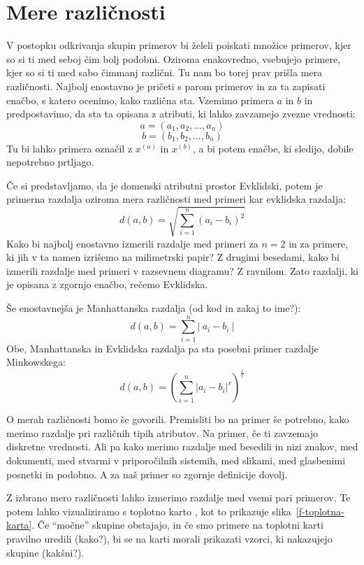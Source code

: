 \section{Mere različnosti}

V postopku odkrivanja skupin primerov bi želeli poiskati množice
primerov, kjer so si ti med seboj čim bolj podobni. Oziroma
enakovredno, vsebujejo primere, kjer so si ti med sabo čimmanj
različni. Tu nam bo torej prav prišla mera različnosti. Najbolj
enostavno je pričeti s parom primerov in za ta zapisati enačbo, s
katero ocenimo, kako različna sta. Vzemimo primera $a$ in $b$ in
predpostavimo, da sta ta opisana z atributi, ki lahko zavzamejo zvezne
vrednosti:
%
$$ a = (a_1,a_2, \ldots, a_n) $$
$$ b = (b_1,b_2, \ldots, b_n) $$
%
Tu bi lahko primera označil z $x^{(a)}$ in $x^{(b)}$, a bi potem
enačbe, ki sledijo, dobile nepotrebno prtljago.

Če si predstavljamo, da je domenski atributni prostor Evklidski, potem
je primerna razdalja oziroma mera različnosti med primeri kar
evklidska razdalja:
$$ d(a,b)=\sqrt{\sum_{i=1}^n(a_i-b_i)^2} $$ 
%
Kako bi najbolj enostavno izmerili razdalje med primeri za $n=2$ in za
primere, ki jih v ta namen izrišemo na milimetrski papir? Z drugimi
besedami, kako bi izmerili razdalje med primeri v razsevnem diagramu?
Z ravnilom. Zato razdalji, ki je opisana z zgornjo enačbo, rečemo
Evklidska.

Še enostavnejša je Manhattanska razdalja (od kod in zakaj to ime?):
$$ d(a,b)={\sum_{i=1}^n|\ a_i-b_i\ |} $$
Obe, Manhattanska in Evklidska razdalja pa sta posebni primer razdalje
Minkowskega:
$$ d(a,b)=({\sum_{i=1}^n|a_i-b_i|^r})^{\frac{1}{r}} $$

O merah različnosti bomo še govorili. Premisliti bo na primer še
potrebno, kako merimo razdalje pri različnih tipih atributov. Na
primer, če ti zavzemajo diskretne vrednosti. Ali pa kako merimo
razdalje med besedili in nizi znakov, med dokumenti, med stvarmi v
priporočilnih sistemih, med slikami, med glasbenimi posnetki in
podobno. A za naš primer so zgornje definicije dovolj.

Z izbrano mero različnosti lahko izmerimo razdalje med vsemi
pari primerov. Te potem lahko vizualiziramo s toplotno karto
, kot to prikazuje slika~\ref{f-toplotna-karta}. Če
``močne'' skupine obstajajo, in če smo primere na toplotni karti
pravilno uredili (kako?), bi se na karti morali prikazati vzorci, ki
nakazujejo skupine (kakšni?).

